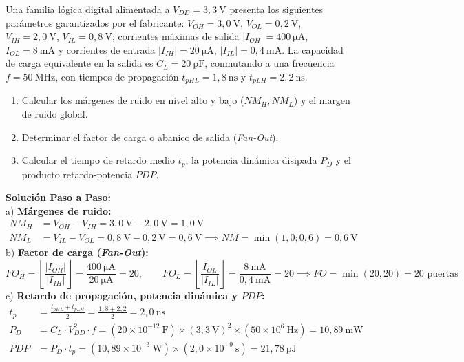 \begin{ejercicio}
Una familia lógica digital alimentada a $V_{DD} = 3{,}3\ \si{\volt}$ presenta los siguientes parámetros garantizados por el fabricante:
$V_{OH} = 3{,}0\ \si{\volt}$, $V_{OL} = 0{,}2\ \si{\volt}$, $V_{IH} = 2{,}0\ \si{\volt}$, $V_{IL} = 0{,}8\ \si{\volt}$; corrientes máximas de salida $|I_{OH}| = 400\ \si{\micro\ampere}$, $I_{OL} = 8\ \si{\milli\ampere}$ y corrientes de entrada $|I_{IH}| = 20\ \si{\micro\ampere}$, $|I_{IL}| = 0{,}4\ \si{\milli\ampere}$.
La capacidad de carga equivalente en la salida es $C_L = 20\ \si{\pico\farad}$, conmutando a una frecuencia $f = 50\ \si{\mega\hertz}$, con tiempos de propagación $t_{pHL} = 1{,}8\ \si{\nano\second}$ y $t_{pLH} = 2{,}2\ \si{\nano\second}$.
\begin{enumerate}[label=\alph*)]
    \item Calcular los márgenes de ruido en nivel alto y bajo ($NM_H, NM_L$) y el margen de ruido global.
    \item Determinar el factor de carga o abanico de salida (\textit{Fan-Out}).
    \item Calcular el tiempo de retardo medio $t_p$, la potencia dinámica disipada $P_D$ y el producto retardo-potencia $PDP$.
\end{enumerate}
\tcbline
\textbf{Solución Paso a Paso:}\\[4pt]
a) \textbf{Márgenes de ruido:}
\begin{align}
    NM_H &= V_{OH} - V_{IH} = 3{,}0\ \si{\volt} - 2{,}0\ \si{\volt} = 1{,}0\ \si{\volt} \\
    NM_L &= V_{IL} - V_{OL} = 0{,}8\ \si{\volt} - 0{,}2\ \si{\volt} = 0{,}6\ \si{\volt} \implies NM = \min(1{,}0; 0{,}6) = 0{,}6\ \si{\volt}
\end{align}
b) \textbf{Factor de carga (\textit{Fan-Out}):}
\begin{equation}
    FO_H = \left\lfloor \frac{|I_{OH}|}{|I_{IH}|} \right\rfloor = \frac{400\ \si{\micro\ampere}}{20\ \si{\micro\ampere}} = 20, \qquad FO_L = \left\lfloor \frac{I_{OL}}{|I_{IL}|} \right\rfloor = \frac{8\ \si{\milli\ampere}}{0{,}4\ \si{\milli\ampere}} = 20 \implies FO = \min(20, 20) = 20\text{ puertas}
\end{equation}
c) \textbf{Retardo de propagación, potencia dinámica y $PDP$:}
\begin{align}
    t_p &= \frac{t_{pHL} + t_{pLH}}{2} = \frac{1{,}8 + 2{,}2}{2} = 2{,}0\ \si{\nano\second} \\
    P_D &= C_L \cdot V_{DD}^2 \cdot f = (20 \times 10^{-12}\ \si{\farad}) \times (3{,}3\ \si{\volt})^2 \times (50 \times 10^6\ \si{\hertz}) = 10{,}89\ \si{\milli\watt} \\
    PDP &= P_D \cdot t_p = (10{,}89 \times 10^{-3}\ \si{\watt}) \times (2{,}0 \times 10^{-9}\ \si{\second}) = 21{,}78\ \si{\pico\joule}
\end{align}
\end{ejercicio}
